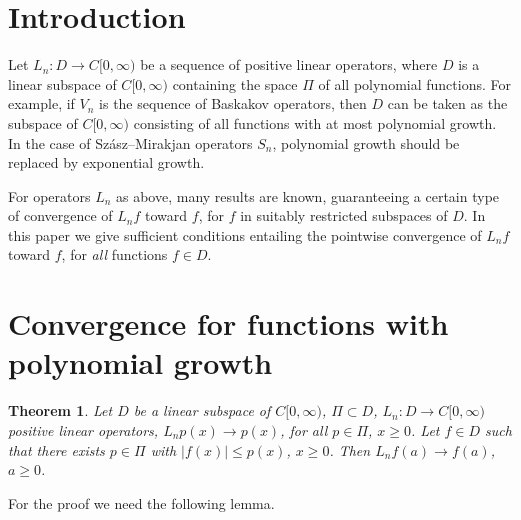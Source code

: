 \documentclass[preprint]{elsarticle}
\newtheorem{theorem}{Theorem}[section]
\numberwithin{equation}{section}
\begin{document}
	

\section{Introduction}

Let $L_n : D \to C[0,\infty)$ be a sequence of positive linear operators, where $D$ is a linear subspace of $C[0,\infty)$ containing the space $\Pi$ of all polynomial functions. For example, if $V_n$ is the sequence of Baskakov operators, then $D$ can be taken as the subspace of $C[0,\infty)$ consisting of all functions with at most polynomial growth. In the case of Sz\'asz--Mirakjan operators $S_n$, polynomial growth should be replaced by exponential growth.

For operators $L_n$ as above, many results are known, guaranteeing a certain type of convergence of $L_n f$ toward $f$, for $f$ in suitably restricted subspaces of $D$. In this paper we give sufficient conditions entailing the pointwise convergence of $L_n f$ toward $f$, for {\it all} functions $f \in D$.

\section{Convergence for functions with polynomial growth}

\begin{theorem}\label{T16}Let $D$ be a linear subspace of $C[0,\infty)$, $\Pi \subset D$, $L_n : D \to C[0,\infty)$  positive linear operators, $L_n p(x) \to p(x)$, for all $ p \in \Pi$, $x \geq 0$. Let $f \in D$ such that there exists $ p \in \Pi$ with $|f(x)| \leq p(x)$, $x \geq 0$. Then $L_n f(a) \to f(a)$, $a \geq 0$.\end{theorem}

For the proof we need the following lemma.
\end{document}
